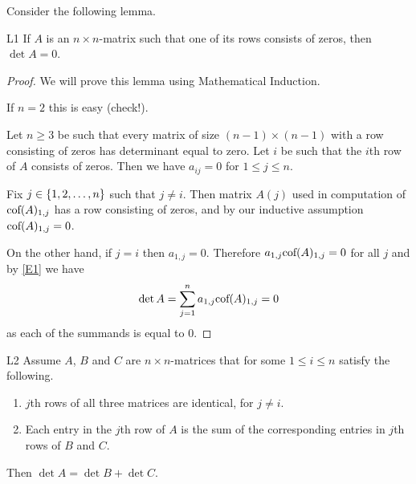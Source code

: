 Consider the following lemma.

\begin{lemma}{}{L1} 
If $A$ is an $n\times n$-matrix such that one of its rows consists of zeros, then 
$\det A=0$. 
\end{lemma} 

\begin{proof} 
We will prove this lemma using Mathematical Induction. 

If $n=2$ this is easy (check!). 

Let $n\geq 3$ be such that every matrix of size $(n-1)\times(n-1)$ with a row consisting of zeros
has determinant equal to zero.  
Let $i$ be such that the $i$th row of $A$ consists of zeros. 
Then we have $a_{ij}=0$ for $1\leq j\leq n$. 

Fix $j\in \left\{1,2, \dots ,n\right\}$ such that $j\neq i$. Then  matrix $A(j)$ used in computation of
 $\mbox{\rm cof}(A)_{1,j}$ has a row consisting of zeros, and by our inductive 
 assumption $\mbox{\rm cof}(A)_{1,j}=0$. 

On the other hand, if $j=i$ then $a_{1,j}=0$.  
Therefore $a_{1,j}\mbox{\rm cof}(A)_{1,j}=0$ for all $j$ and by \eqref{E1} we have 
\[
\det A=\sum_{j=1}^n a_{1,j} \mbox{\rm cof}(A)_{1,j}=0
\]
as each of the summands is equal to 0. 
\end{proof} 

\begin{lemma}{}{L2} 
Assume $A$, $B$ and $C$ are $n\times n$-matrices that for some 
 $1\leq i\leq n$ satisfy the following. 
\begin{enumerate}
\item $j$th rows of all three matrices are identical, for $j\neq i$. 

\item Each entry in the $j$th row of $A$ is the sum of the corresponding 
entries in $j$th rows of $B$ and $C$. 
\end{enumerate}

Then $\det A=\det B+\det C$. 
\end{lemma} 

